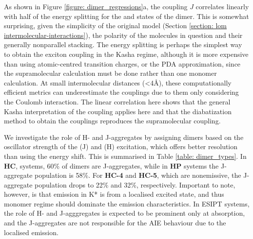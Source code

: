 As shown in  Figure \ref{figure: dimer_regressions}a, the coupling $J$ correlates linearly with half of the energy splitting for the \sone{} and \stwo{} states of the dimer. This is somewhat surprising, given the simplicity of the original model (Section \ref{section: lom intermolecular-interactions}), the polarity of the molecules in question and their generally nonparallel stacking. The energy splitting is perhaps the simplest way to obtain the exciton coupling in the Kasha regime, although it is more expensive than using atomic-centred transition charges, or the PDA approximation, since the supramolecular calculation must be done rather than one monomer calculation. At small intermolecular distances (\textless4{\AA}), these computationally efficient metrics can underestimate the couplings due to them only considering the Coulomb interaction.\cite{Kistler2013} The linear correlation here shows that the general Kasha interpretation of the coupling applies here and that the diabatization method to obtain the couplings reproduces the supramolecular coupling.

We investigate the role of H- and J-aggregates by assigning dimers based on the oscillator strength of the \sone{} (J) and \stwo{} (H) excitation, which offers better resolution than using the energy shift. This is summarised in Table \ref{table: dimer_types}.  In \textbf{HC}, systems, 60\% of dimers are J-aggregates, while in \textbf{HP} systems the J-aggregate population is 58\%. For \textbf{HC-4} and \textbf{HC-5}, which are nonemissive, the J-aggregate population drops to 22\% and 32\%, respectively. Important to note, however, is that emission in K* is from a localised excited state, and thus monomer regime should dominate the emission characteristics. In ESIPT systems, the role of H- and J-agggregates is expected to be prominent only at absorption, and the J-aggregates are not responsible for the AIE behaviour due to the localised emission.

